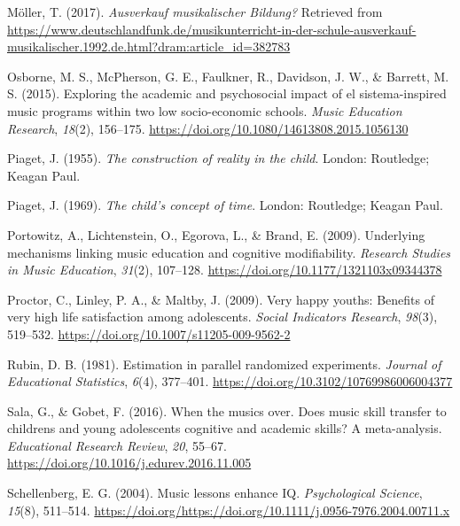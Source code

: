 \documentclass[a4, 12pt]{article}
\begin{document}
\leavevmode\hypertarget{ref-Moeller2017}{}%
Möller, T. (2017). \emph{Ausverkauf musikalischer Bildung?} Retrieved from \url{https://www.deutschlandfunk.de/musikunterricht-in-der-schule-ausverkauf-musikalischer.1992.de.html?dram:article_id=382783}

\leavevmode\hypertarget{ref-Osborne2015}{}%
Osborne, M. S., McPherson, G. E., Faulkner, R., Davidson, J. W., \& Barrett, M. S. (2015). Exploring the academic and psychosocial impact of el sistema-inspired music programs within two low socio-economic schools. \emph{Music Education Research}, \emph{18}(2), 156--175. \url{https://doi.org/10.1080/14613808.2015.1056130}

\leavevmode\hypertarget{ref-Piaget1955}{}%
Piaget, J. (1955). \emph{The construction of reality in the child}. London: Routledge; Keagan Paul.

\leavevmode\hypertarget{ref-Piaget1969}{}%
Piaget, J. (1969). \emph{The child's concept of time}. London: Routledge; Keagan Paul.

\leavevmode\hypertarget{ref-Portowitz2009}{}%
Portowitz, A., Lichtenstein, O., Egorova, L., \& Brand, E. (2009). Underlying mechanisms linking music education and cognitive modifiability. \emph{Research Studies in Music Education}, \emph{31}(2), 107--128. \url{https://doi.org/10.1177/1321103x09344378}

\leavevmode\hypertarget{ref-Proctor2009a}{}%
Proctor, C., Linley, P. A., \& Maltby, J. (2009). Very happy youths: Benefits of very high life satisfaction among adolescents. \emph{Social Indicators Research}, \emph{98}(3), 519--532. \url{https://doi.org/10.1007/s11205-009-9562-2}

\leavevmode\hypertarget{ref-Rubin1981}{}%
Rubin, D. B. (1981). Estimation in parallel randomized experiments. \emph{Journal of Educational Statistics}, \emph{6}(4), 377--401. \url{https://doi.org/10.3102/10769986006004377}

\leavevmode\hypertarget{ref-Sala2016}{}%
Sala, G., \& Gobet, F. (2016). When the musics over. Does music skill transfer to childrens and young adolescents cognitive and academic skills? A meta-analysis. \emph{Educational Research Review}, \emph{20}, 55--67. \url{https://doi.org/10.1016/j.edurev.2016.11.005}

\leavevmode\hypertarget{ref-Schellenberg2004}{}%
Schellenberg, E. G. (2004). Music lessons enhance IQ. \emph{Psychological Science}, \emph{15}(8), 511--514. \url{https://doi.org/https://doi.org/10.1111/j.0956-7976.2004.00711.x}
\end{document}
